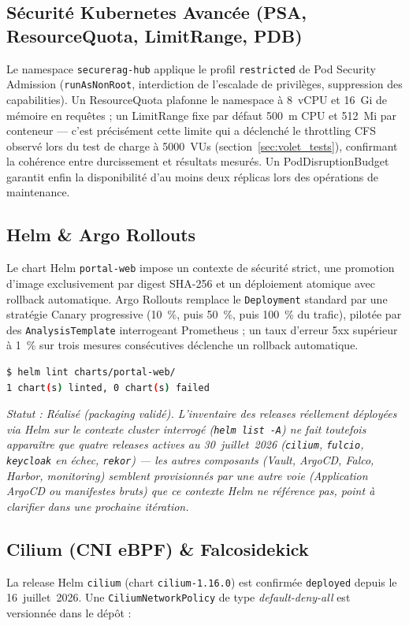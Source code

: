 \subsection{Sécurité Kubernetes Avancée (PSA, ResourceQuota, LimitRange, PDB)}
Le namespace \texttt{securerag-hub} applique le profil \texttt{restricted} de Pod Security Admission (\texttt{runAsNonRoot}, interdiction de l'escalade de privilèges, suppression des capabilities). Un ResourceQuota plafonne le namespace à 8~vCPU et 16~Gi de mémoire en requêtes ; un LimitRange fixe par défaut 500~m CPU et 512~Mi par conteneur — c'est précisément cette limite qui a déclenché le throttling CFS observé lors du test de charge à 5000~VUs (section~\ref{sec:volet_tests}), confirmant la cohérence entre durcissement et résultats mesurés. Un PodDisruptionBudget garantit enfin la disponibilité d'au moins deux réplicas lors des opérations de maintenance.

\subsection{Helm \& Argo Rollouts}
Le chart Helm \texttt{portal-web} impose un contexte de sécurité strict, une promotion d'image exclusivement par digest SHA-256 et un déploiement atomique avec rollback automatique. Argo Rollouts remplace le \texttt{Deployment} standard par une stratégie Canary progressive (10~\%, puis 50~\%, puis 100~\% du trafic), pilotée par des \texttt{AnalysisTemplate} interrogeant Prometheus ; un taux d'erreur 5xx supérieur à 1~\% sur trois mesures consécutives déclenche un rollback automatique.

\begin{lstlisting}[language=bash, caption={Validation locale du chart Helm (dry-run)}, label={lst:helm_dryrun_proof}]
$ helm lint charts/portal-web/
1 chart(s) linted, 0 chart(s) failed
\end{lstlisting}

\textit{Statut : Réalisé (packaging validé). L'inventaire des releases réellement déployées via Helm sur le contexte cluster interrogé (\texttt{helm list -A}) ne fait toutefois apparaître que quatre releases actives au 30~juillet~2026 (\texttt{cilium}, \texttt{fulcio}, \texttt{keycloak} en échec, \texttt{rekor}) — les autres composants (Vault, ArgoCD, Falco, Harbor, monitoring) semblent provisionnés par une autre voie (Application ArgoCD ou manifestes bruts) que ce contexte Helm ne référence pas, point à clarifier dans une prochaine itération.}

\subsection{Cilium (CNI eBPF) \& Falcosidekick}
\label{subsec:cilium_v2}
La release Helm \texttt{cilium} (chart \texttt{cilium-1.16.0}) est confirmée \texttt{deployed} depuis le 16~juillet~2026. Une \texttt{CiliumNetworkPolicy} de type \textit{default-deny-all} est versionnée dans le dépôt :

